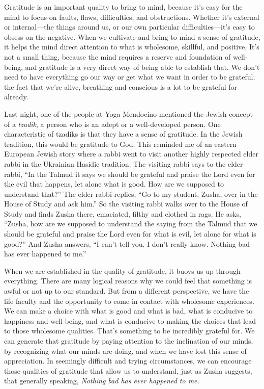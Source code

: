 Gratitude is an important quality to bring to mind, because it's easy 
for the mind to focus on faults, flaws, difficulties, and obstructions. 
Whether it's external or internal---the things around us, or our own 
particular difficulties---it's easy to obsess on the negative. When we 
cultivate and bring to mind a sense of gratitude, it helps the mind 
direct attention to what is wholesome, skillful, and positive. It's not 
a small thing, because the mind requires a reserve and foundation of 
well-being, and gratitude is a very direct way of being able to 
establish that. We don't need to have everything go our way or get what 
we want in order to be grateful; the fact that we're alive, breathing 
and conscious is a lot to be grateful for already.

Last night, one of the people at Yoga Mendocino mentioned the Jewish 
concept of a \emph{tzadik}, a person who is an adept or a 
well-developed person. One characteristic of tzadiks is that they have 
a sense of gratitude. In the Jewish tradition, this would be gratitude 
to God. This reminded me of an eastern European Jewish story where a 
rabbi went to visit another highly respected elder rabbi in the 
Ukrainian Hasidic tradition. The visiting rabbi says to the elder 
rabbi, ``In the Talmud it says we should be grateful and praise the 
Lord even for the evil that happens, let alone what is good. How are we 
supposed to understand that?'' The elder rabbi replies, ``Go to my 
student, Zusha, over in the House of Study and ask him.'' So the 
visiting rabbi walks over to the House of Study and finds Zusha there, 
emaciated, filthy and clothed in rags. He asks, ``Zusha, how are we 
supposed to understand the saying from the Talmud that we should be 
grateful and praise the Lord even for what is evil, let alone for what 
is good?'' And Zusha answers, ``I can't tell you. I don't really know. 
Nothing bad has ever happened to me.''

When we are established in the quality of gratitude, it buoys us up 
through everything. There are many logical reasons why we could feel 
that something is awful or not up to our standard. But from a different 
perspective, we have the life faculty and the opportunity to come in 
contact with wholesome experiences. We can make a choice with what is 
good and what is bad, what is conducive to happiness and well-being, 
and what is conducive to making the choices that lead to those 
wholesome qualities. That's something to be incredibly grateful for. We 
can generate that gratitude by paying attention to the inclination of 
our minds, by recognizing what our minds are doing, and when we have 
lost this sense of appreciation. In seemingly difficult and trying 
circumstances, we can encourage those qualities of gratitude that allow 
us to understand, just as Zusha suggests, that generally speaking, 
\emph{Nothing bad has ever happened to me.}

